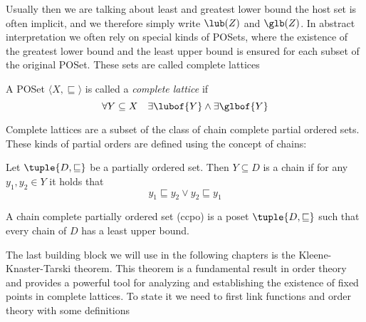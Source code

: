 Usually then we are talking about least and greatest lower bound the
host set is often implicit, and we therefore simply write
\(\lub({Z})\) and \(\glb({Z})\).  In abstract interpretation we often
rely on special kinds of POSets, where the existence of the greatest
lower bound and the least upper bound is ensured for each subset of
the original POSet. These sets are called complete lattices

\begin{definition}
  A POSet \(\langle X, \sqsubseteq\rangle\) is called a \emph{complete
  lattice} if \[\forall Y \subseteq X \quad \exists \lubof{Y} \wedge
  \exists \glbof{Y}\]
\end{definition}

Complete lattices are a subset of the class of chain complete partial
ordered sets. These kinds of partial orders are defined using the
concept of chains:

\begin{definition}[Chain]
  Let \(\tuple{D, \sqsubseteq}\) be a partially ordered set. Then
  \(Y\subseteq D\) is a chain if for any \(y_1, y_2 \in Y\) it holds
  that
  \begin{equation*}
    y_1 \sqsubseteq y_2 \vee y_2 \sqsubseteq y_1
  \end{equation*}
\end{definition}

\begin{definition} A chain complete partially ordered
  set (ccpo) is a poset \(\tuple{D, \sqsubseteq}\) such that every
  chain of \(D\) has a least upper bound.
\end{definition}



The last building block we will use in the following chapters is the
Kleene-Knaster-Tarski theorem. This theorem is a fundamental result in
order theory and provides a powerful tool for analyzing and
establishing the existence of fixed points in complete lattices. To
state it we need to first link functions and order theory with some
definitions

